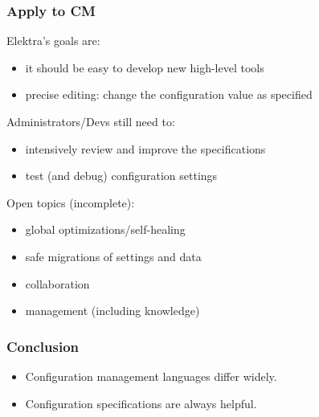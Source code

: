 \begin{frame}
	\frametitle{Apply to CM}

	Elektra's goals are:

	\begin{itemize}[<+-| alert@+>]
	\item it should be easy to develop new high-level tools
	\item precise editing: change the configuration value as specified
	\end{itemize}

	\pause[\thebeamerpauses]  %

	Administrators/Devs still need to:

	\begin{itemize}[<+-| alert@+>]
	\item intensively review and improve the specifications
	\item test (and debug) configuration settings
	\end{itemize}

	\pause[\thebeamerpauses]  %

	Open topics (incomplete):

	\begin{itemize}[<+-| alert@+>]
	\item global optimizations/self-healing
	\item safe migrations of settings and data
	\item collaboration
	\item management (including knowledge)
	\end{itemize}
\end{frame}

\begin{frame}
	\frametitle{Conclusion}

	\begin{itemize}[<+-| alert@+>]
	\item Configuration management languages differ widely.
	\item Configuration specifications are always helpful.
	\end{itemize}
\end{frame}



\nocite{raab2017introducing}

\appendix

\begin{frame}[allowframebreaks]
	
	
\end{frame}




